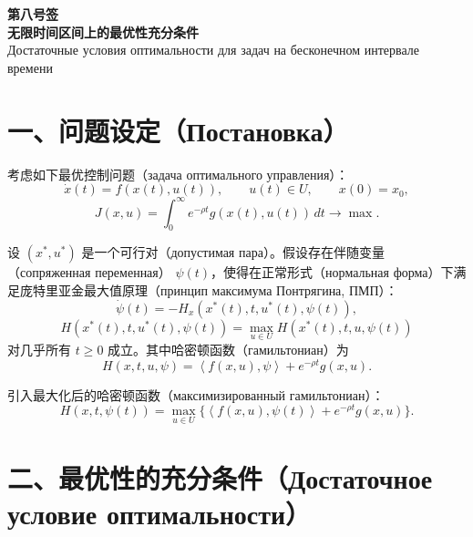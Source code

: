 \documentclass[12pt,a4paper]{article}
\newcommand{\term}[2]{#1（#2）}
\newcommand{\inner}[2]{\left\langle #1,#2\right\rangle}
\begin{document}
\begin{center}
    {\LARGE \textbf{第八号签}}\\[0.5em]
    {\large \textbf{无限时间区间上的最优性充分条件}}\\[0.25em]
    {\large Достаточные условия оптимальности для задач на бесконечном интервале времени}
\end{center}

\vspace{1em}

\section*{一、问题设定（Постановка）}

考虑如下\term{最优控制问题}{задача оптимального управления}：
\begin{equation}
    \dot{x}(t)=f(x(t),u(t)),\qquad u(t)\in U,\qquad x(0)=x_0,
\end{equation}
\begin{equation}
    J(x,u)=\int_0^{\infty} e^{-\rho t}g(x(t),u(t))\,dt\to \max .
\end{equation}

设 $(x^*,u^*)$ 是一个\term{可行对}{допустимая пара}。假设存在\term{伴随变量}{сопряженная переменная} $\psi(t)$，使得在\term{正常形式}{нормальная форма}下满足\term{庞特里亚金最大值原理}{принцип максимума Понтрягина, ПМП}：
\begin{equation}
    \dot{\psi}(t)=-H_x(x^*(t),t,u^*(t),\psi(t)),
\end{equation}
\begin{equation}
    H(x^*(t),t,u^*(t),\psi(t))
    =\max_{u\in U}H(x^*(t),t,u,\psi(t))
\end{equation}
对几乎所有 $t\ge 0$ 成立。其中\term{哈密顿函数}{гамильтониан}为
\begin{equation}
    H(x,t,u,\psi)=\inner{f(x,u)}{\psi}+e^{-\rho t}g(x,u).
\end{equation}

引入\term{最大化后的哈密顿函数}{максимизированный гамильтониан}：
\begin{equation}
    H(x,t,\psi(t))
    =\max_{u\in U}\{\inner{f(x,u)}{\psi(t)}+e^{-\rho t}g(x,u)\}.
\end{equation}

\section*{二、最优性的充分条件（Достаточное условие оптимальности）}
\end{document}
